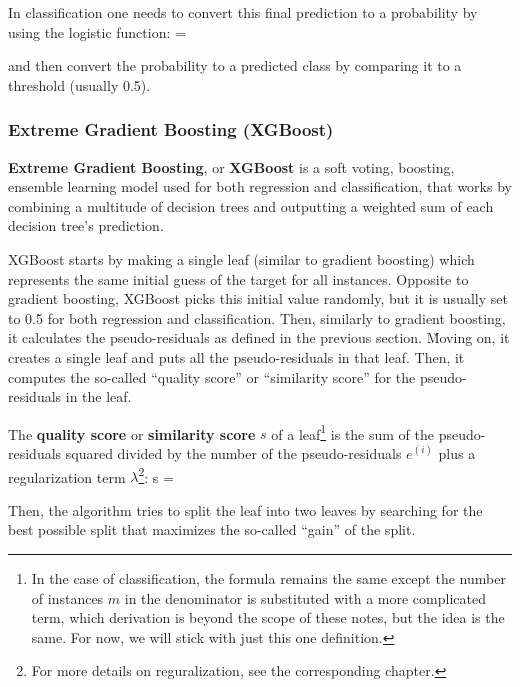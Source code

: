 In classification one needs to convert this final prediction to a probability by using the logistic function:
\bse
{} = 
\ese

and then convert the probability to a predicted class by comparing it to a threshold (usually 0.5).

\subsubsection{Extreme Gradient Boosting (XGBoost)}

\textbf{Extreme Gradient Boosting}, or \textbf{XGBoost} is a soft voting, boosting, ensemble learning model used for
both regression and classification, that works by combining a multitude of decision trees and outputting a weighted
sum of each decision tree's prediction.
\ed

XGBoost starts by making a single leaf (similar to gradient boosting) which represents the same initial guess of the
target for all instances. Opposite to gradient boosting, XGBoost picks this initial value randomly, but it is usually
set to 0.5 for both regression and classification. Then, similarly to gradient boosting, it calculates the
pseudo-residuals as defined in the previous section. \v

Moving on, it creates a single leaf and puts all the pseudo-residuals in that leaf. Then, it computes the so-called
``quality score'' or ``similarity score'' for the pseudo-residuals in the leaf.

The \textbf{quality score} or \textbf{similarity score} $s$ of a leaf\footnote{In the case of classification, the
formula remains the same except the number of instances $m$ in the denominator is substituted with a more complicated
term, which derivation is beyond the scope of these notes, but the idea is the same. For now, we will stick with just
this one definition.} is the sum of the pseudo-residuals squared divided by the number of the pseudo-residuals $e^{(i)}$
plus a regularization term $\lambda$\footnote{For more details on reguralization, see the corresponding chapter.}:
\bse
s = 
\ese
\ed

Then, the algorithm tries to split the leaf into two leaves by searching for the best possible split that maximizes
the so-called ``gain'' of the split.

